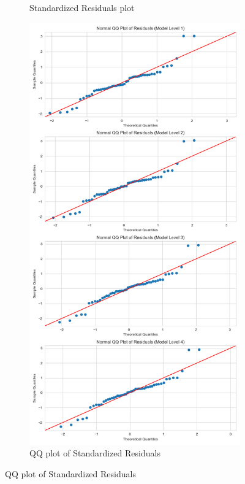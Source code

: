 \documentclass[11pt, oneside]{article}   	%
\begin{document}
\begin{figure}[H]
\begin{subfigure}{.5\textwidth}
  \caption{Standardized Residuals plot}
\end{subfigure}%
\begin{subfigure}{.5\textwidth}
  \centering  
  \includegraphics[width=\linewidth]{../plots/fnn_data/hierarchy1/qq_residuals}
  \caption{QQ plot of Standardized Residuals}
\end{subfigure}
\end{figure}
\end{document}
